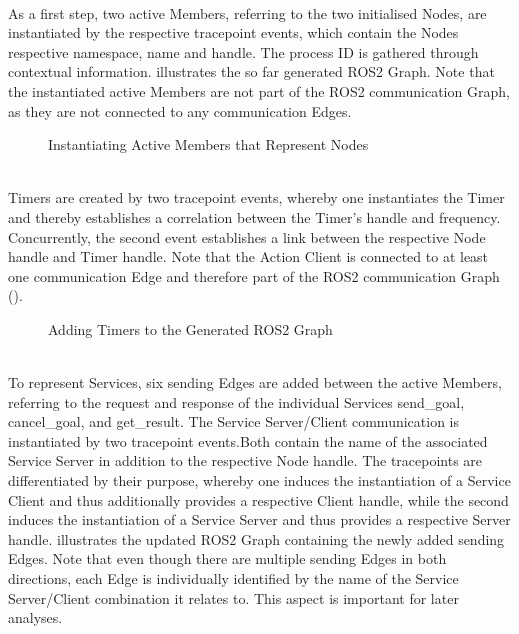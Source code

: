     \begin{description}[leftmargin=\descriptionIndent, itemsep=-0.2em]
        \item [1) Instantiating Nodes] \hfill \\
        As a first step, two active Members, referring to the two initialised Nodes, are instantiated by the respective tracepoint events, which contain the Nodes respective namespace, name and handle. The process ID is gathered through contextual information.  illustrates the so far generated ROS2 Graph. Note that the instantiated active Members are not part of the ROS2 communication Graph, as they are not connected to any communication Edges.
        \begin{figure}[h]
            \centering
            
            \caption[Instantiating Active Members that Represent Nodes]{Instantiating Active Members that Represent Nodes \circledLegend} \label{fig:neo4j:exemplarygraph:nodes}
        \end{figure}
        \item [2) Instantiating Timers] \hfill \\
        Timers are created by two tracepoint events, whereby one instantiates the Timer and thereby establishes a correlation between the Timer's handle and frequency. Concurrently, the second event establishes a link between the respective Node handle and Timer handle. Note that the Action Client is connected to at least one communication Edge and therefore part of the ROS2 communication Graph ().
        \begin{figure}[h]
            \centering
            
            \caption[Adding Timers to the Generated ROS2 Graph]{Adding Timers to the Generated ROS2 Graph \circledLegend} \label{fig:neo4j:exemplarygraph:timer}
        \end{figure}
        \enlargethispage{1\baselineskip}
        \item [3) Instantiating Services] \hfill \\
        To represent Services, six sending Edges are added between the active Members, referring to the request and response of the individual Services \glqq{}send\_goal\grqq{}, \glqq{}cancel\_goal\grqq{}, and \glqq{}get\_result\grqq{}. The Service Server/Client communication is instantiated by two tracepoint events.\clearpage Both contain the name of the associated Service Server in addition to the respective Node handle. The tracepoints are differentiated by their purpose, whereby one induces the instantiation of a Service Client and thus additionally provides a respective Client handle, while the second induces the instantiation of a Service Server and thus provides a respective Server handle.  illustrates the updated ROS2 Graph containing the newly added sending Edges. Note that even though there are multiple sending Edges in both directions, each Edge is individually identified by the name of the Service Server/Client combination it relates to. This aspect is important for later analyses.

\end{description}
